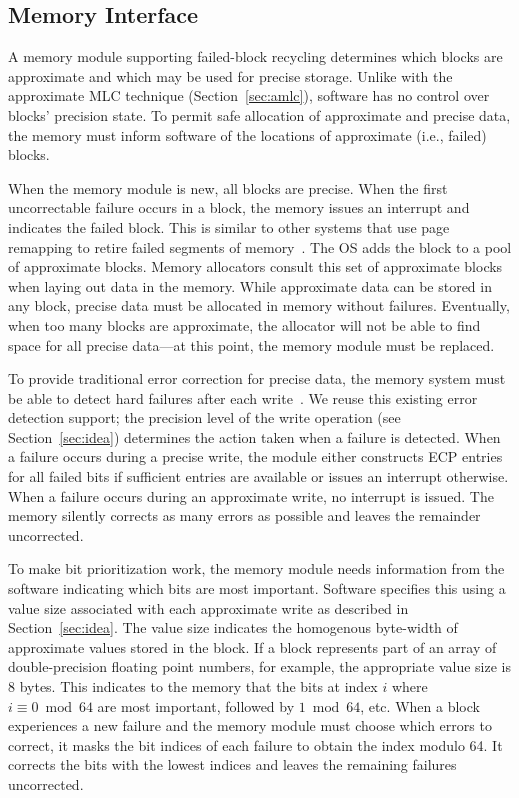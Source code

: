 \documentclass[prodmode,acmtocs]{acmsmall}
\begin{document}
\subsection{Memory Interface}
\label{sec:recycling-interface}

A memory module supporting failed-block recycling determines which blocks are
approximate and which may be used for precise storage. Unlike with the
approximate MLC technique (Section~\ref{sec:amlc}), software has no control
over blocks' precision state. To permit safe allocation of approximate and
precise data, the memory must inform software of the locations of approximate
(i.e., failed) blocks.

When the memory module is new, all blocks are precise. When the first
uncorrectable failure occurs in a block, the memory issues an interrupt
and indicates the failed block.
This is similar to other systems that use page remapping to retire failed
segments of memory~\cite{durable-pcm-mm,drm}.
The OS adds the
block to a pool of approximate blocks. Memory allocators consult this set of
approximate blocks when laying out data in the memory. While approximate data
can be stored in any block, precise data must be allocated in memory without
failures. Eventually, when too many blocks are approximate, the allocator will
not be able to find space for all precise data---at this point, the memory
module must be replaced.

To provide traditional error correction for precise data, the memory system must be
able to detect hard failures after each write~\cite{ecp}. We reuse this
existing error detection support; the precision level of
the write operation (see Section~\ref{sec:idea}) determines the action taken
when a failure is detected. When a failure occurs during a precise write, the
module either constructs ECP entries for all failed bits if sufficient
entries are available or issues an interrupt otherwise. When a failure occurs
during an approximate write, no interrupt is issued. The memory silently
corrects as many errors as possible and leaves the remainder uncorrected.

To make bit prioritization work, the memory module needs information from
the software indicating which bits are most important. Software specifies this
using a value size associated with each approximate write as described in
Section~\ref{sec:idea}. The value size indicates the homogenous byte-width of
approximate values stored in the block. If a block represents part of an array
of double-precision floating point numbers, for example, the appropriate value
size is 8 bytes. This indicates to the memory that the bits at index $i$ where
$i \equiv 0 \bmod{64}$ are most important, followed by $1 \bmod{64}$, etc. When
a block experiences a new failure and the memory module must
choose which errors to correct, it masks the bit indices of
each failure to obtain the index modulo 64. It corrects the bits with the
lowest indices and leaves the remaining failures uncorrected.
\end{document}
